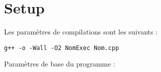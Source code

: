 \section{Setup}

Les paramètres de compilations sont les suivants : 

\begin{verbatim}
g++ -o -Wall -O2 NomExec Nom.cpp
\end{verbatim}

Paramètres de base du programme : 
